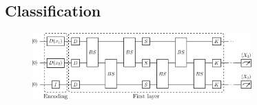 \documentclass[12pt, a4paper,  nobibnotes]{article}
\begin{document}
\subsection{Classification}
\begin{figure}[H]
    \centering
    \includegraphics[width=0.75\textwidth]{figures/Classifier-Circles-Ansatz.pdf}
    \caption{}
    \label{fig:single_layer_classification}
\end{figure}


\newcommand{\thisfigurewidth}{0.31}
\end{document}

